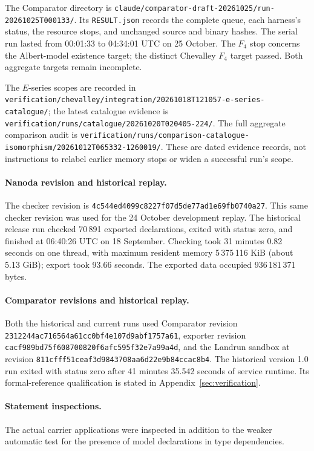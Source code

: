 \documentclass[11pt]{article}
\numberwithin{equation}{section}
\theoremstyle{definition}
\newcommand{\leanname}[1]{{\small\nolinkurl{#1}}}
\begin{document}
The Comparator directory is
\leanname{claude/comparator-draft-20261025/run-20261025T000133/}.
Its \leanname{RESULT.json} records the complete queue, each harness's
status, the resource stops, and unchanged source and binary hashes.
The serial run lasted from 00:01:33 to 04:34:01 UTC on 25 October.
The $F_4$ stop concerns the Albert-model existence target; the distinct
Chevalley $F_4$ target passed. Both aggregate targets remain incomplete.

The $E$-series scopes are recorded in
\leanname{verification/chevalley/integration/20261018T121057-e-series-catalogue/};
the latest catalogue evidence is
\leanname{verification/runs/catalogue/20261020T020405-224/}.
The full aggregate comparison audit is
\leanname{verification/runs/comparison-catalogue-isomorphism/20261012T065332-1260019/}.
These are dated evidence records, not instructions to relabel earlier
memory stops or widen a successful run's scope.

\paragraph{Nanoda revision and historical replay.}
The checker revision is
\leanname{4c544ed4099c8227f07d5de77ad1e69fb0740a27}.
This same checker revision was used for the 24 October development replay. The historical release run checked 70\,891 exported declarations, exited with status zero,
and finished at 06:40:26 UTC on 18 September. Checking took
31 minutes 0.82 seconds on one thread, with maximum resident memory
5\,375\,116 KiB (about 5.13 GiB); export took 93.66 seconds.
The exported data occupied 936\,181\,371 bytes.

\paragraph{Comparator revisions and historical replay.}
Both the historical and current runs used Comparator revision
\leanname{2312244ac716564a61cc0bf4e107d9abf1757a61}, exporter revision
\leanname{cacf989bd75f608700820f6afc595f32e7a99a4d}, and the Landrun sandbox
at revision \leanname{811cfff51ceaf3d9843708aa6d22e9b84ccac8b4}.
The historical version 1.0 run exited with status zero after 41 minutes 35.542 seconds of service
runtime. Its formal-reference qualification is stated in
Appendix~\ref{sec:verification}.

\paragraph{Statement inspections.}
The actual carrier applications were inspected in addition to the
weaker automatic test for the presence of model declarations in type
dependencies.
\end{document}
